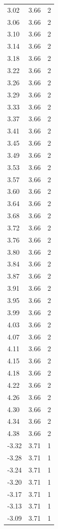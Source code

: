 \begin{longtable}{lrr}
  3.02 & 3.66 & 2 \\
  3.06 & 3.66 & 2 \\
  3.10 & 3.66 & 2 \\
  3.14 & 3.66 & 2 \\
  3.18 & 3.66 & 2 \\
  3.22 & 3.66 & 2 \\
  3.26 & 3.66 & 2 \\
  3.29 & 3.66 & 2 \\
  3.33 & 3.66 & 2 \\
  3.37 & 3.66 & 2 \\
  3.41 & 3.66 & 2 \\
  3.45 & 3.66 & 2 \\
  3.49 & 3.66 & 2 \\
  3.53 & 3.66 & 2 \\
  3.57 & 3.66 & 2 \\
  3.60 & 3.66 & 2 \\
  3.64 & 3.66 & 2 \\
  3.68 & 3.66 & 2 \\
  3.72 & 3.66 & 2 \\
  3.76 & 3.66 & 2 \\
  3.80 & 3.66 & 2 \\
  3.84 & 3.66 & 2 \\
  3.87 & 3.66 & 2 \\
  3.91 & 3.66 & 2 \\
  3.95 & 3.66 & 2 \\
  3.99 & 3.66 & 2 \\
  4.03 & 3.66 & 2 \\
  4.07 & 3.66 & 2 \\
  4.11 & 3.66 & 2 \\
  4.15 & 3.66 & 2 \\
  4.18 & 3.66 & 2 \\
  4.22 & 3.66 & 2 \\
  4.26 & 3.66 & 2 \\
  4.30 & 3.66 & 2 \\
  4.34 & 3.66 & 2 \\
  4.38 & 3.66 & 2 \\
  -3.32 & 3.71 & 1 \\
  -3.28 & 3.71 & 1 \\
  -3.24 & 3.71 & 1 \\
  -3.20 & 3.71 & 1 \\
  -3.17 & 3.71 & 1 \\
  -3.13 & 3.71 & 1 \\
  -3.09 & 3.71 & 1 \\

\end{longtable}
